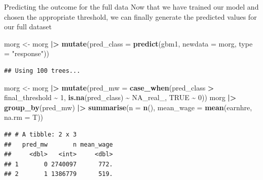 \documentclass[
  ignorenonframetext,
]{beamer}
\newenvironment{Shaded}{\begin{snugshade}}{\end{snugshade}}
\newcommand{\AttributeTok}[1]{\textcolor[rgb]{0.13,0.29,0.53}{#1}}
\newcommand{\ConstantTok}[1]{\textcolor[rgb]{0.56,0.35,0.01}{#1}}
\newcommand{\DecValTok}[1]{\textcolor[rgb]{0.00,0.00,0.81}{#1}}
\newcommand{\FunctionTok}[1]{\textcolor[rgb]{0.13,0.29,0.53}{\textbf{#1}}}
\newcommand{\NormalTok}[1]{#1}
\newcommand{\OtherTok}[1]{\textcolor[rgb]{0.56,0.35,0.01}{#1}}
\newcommand{\SpecialCharTok}[1]{\textcolor[rgb]{0.81,0.36,0.00}{\textbf{#1}}}
\newcommand{\StringTok}[1]{\textcolor[rgb]{0.31,0.60,0.02}{#1}}
\begin{document}
\begin{frame}[fragile]{Predicting the outcome for the full data}
\label{predicting-the-outcome-for-the-full-data}
Now that we have trained our model and chosen the appropriate threshold,
we can finally generate the predicted values for our full dataset

\scriptsize

\begin{Shaded}
\begin{Highlighting}[]
\NormalTok{morg }\OtherTok{\textless{}{-}}\NormalTok{ morg }\SpecialCharTok{|\textgreater{}}
  \FunctionTok{mutate}\NormalTok{(}\AttributeTok{pred\_class =} \FunctionTok{predict}\NormalTok{(gbm1, }\AttributeTok{newdata =}\NormalTok{ morg, }\AttributeTok{type =} \StringTok{"response"}\NormalTok{))}
\end{Highlighting}
\end{Shaded}

\begin{verbatim}
## Using 100 trees...
\end{verbatim}

\begin{Shaded}
\begin{Highlighting}[]
\NormalTok{morg }\OtherTok{\textless{}{-}}\NormalTok{ morg }\SpecialCharTok{|\textgreater{}}
  \FunctionTok{mutate}\NormalTok{(}\AttributeTok{pred\_mw =} \FunctionTok{case\_when}\NormalTok{(pred\_class }\SpecialCharTok{\textgreater{}}\NormalTok{ final\_threshold }\SpecialCharTok{\textasciitilde{}} \DecValTok{1}\NormalTok{,}
                             \FunctionTok{is.na}\NormalTok{(pred\_class) }\SpecialCharTok{\textasciitilde{}} \ConstantTok{NA\_real\_}\NormalTok{,}
                             \ConstantTok{TRUE} \SpecialCharTok{\textasciitilde{}} \DecValTok{0}\NormalTok{))}
\NormalTok{morg }\SpecialCharTok{|\textgreater{}}
  \FunctionTok{group\_by}\NormalTok{(pred\_mw) }\SpecialCharTok{|\textgreater{}}
  \FunctionTok{summarise}\NormalTok{(}\AttributeTok{n =} \FunctionTok{n}\NormalTok{(),}
            \AttributeTok{mean\_wage =} \FunctionTok{mean}\NormalTok{(earnhre, }\AttributeTok{na.rm =}\NormalTok{ T))}
\end{Highlighting}
\end{Shaded}

\begin{verbatim}
## # A tibble: 2 x 3
##   pred_mw       n mean_wage
##     <dbl>   <int>     <dbl>
## 1       0 2740097      772.
## 2       1 1386779      519.
\end{verbatim}
\end{frame}
\end{document}
